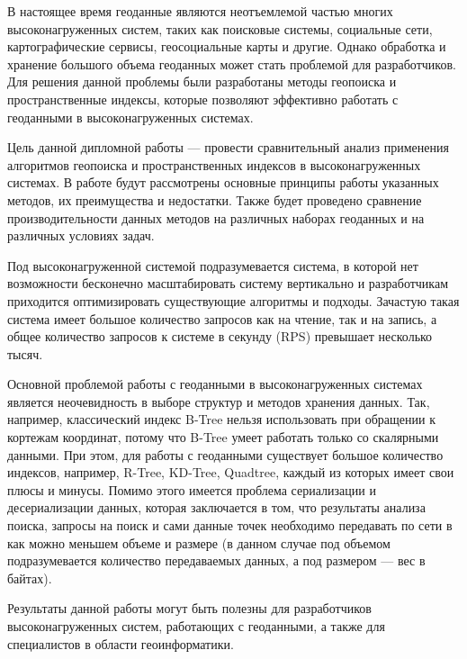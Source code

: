 
В настоящее время геоданные являются неотъемлемой частью многих высоконагруженных систем, таких как поисковые системы, социальные сети, картографические сервисы, геосоциальные карты и другие. Однако обработка и хранение большого объема геоданных может стать проблемой для разработчиков. Для решения данной проблемы были разработаны методы геопоиска и пространственные индексы, которые позволяют эффективно работать с геоданными в высоконагруженных системах.

Цель данной дипломной работы — провести сравнительный анализ применения алгоритмов геопоиска и пространственных индексов в высоконагруженных системах. В работе будут рассмотрены основные принципы работы указанных методов, их преимущества и недостатки. Также будет проведено сравнение производительности данных методов на различных наборах геоданных и на различных условиях задач.

Под высоконагруженной системой подразумевается система, в которой нет возможности бесконечно масштабировать систему вертикально и разработчикам приходится оптимизировать существующие алгоритмы и подходы. Зачастую такая система имеет большое количество запросов как на чтение, так и на запись, а общее количество запросов к системе в секунду (RPS) превышает несколько тысяч. 

Основной проблемой работы с геоданными в высоконагруженных системах является неочевидность в выборе структур и методов хранения данных. Так, например, классический индекс B-Tree нельзя использовать при обращении к кортежам координат, потому что B-Tree умеет работать только со скалярными данными. При этом, для работы с геоданными существует большое количество индексов, например, R-Tree, KD-Tree, Quadtree, каждый из которых имеет свои плюсы и минусы. Помимо этого имеется проблема сериализации и десериализации данных, которая заключается в том, что результаты анализа поиска, запросы на поиск и сами данные точек необходимо передавать по сети в как можно меньшем объеме и размере (в данном случае под объемом подразумевается количество передаваемых данных, а под размером — вес в байтах).

Результаты данной работы могут быть полезны для разработчиков высоконагруженных систем, работающих с геоданными, а также для специалистов в области геоинформатики.

